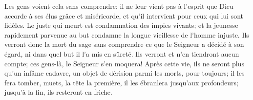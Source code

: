 Les gens voient cela sans comprendre;
	il ne leur vient pas à l’esprit que Dieu accorde à ses élus grâce et miséricorde,
	et qu’il intervient pour ceux qui lui sont fidèles.
Le juste qui meurt est condamnation des impies vivants;
	et la jeunesse rapidement parvenue au but
		condamne la longue vieillesse de l’homme injuste.
Ils verront donc la mort du sage sans comprendre ce que le Seigneur a décidé à son égard,
	ni dans quel but il l’a mis en sûreté.
Ils verront et n’en tiendront aucun compte;
	ces gens-là, le Seigneur s’en moquera!
Après cette vie, ils ne seront plus qu’un infâme cadavre,
	un objet de dérision parmi les morts, pour toujours;
	il les fera tomber, muets, la tête la première,
	il les ébranlera jusqu’aux profondeurs;
	jusqu’à la fin, ils resteront en friche.
